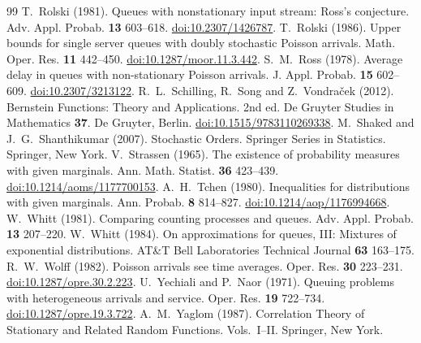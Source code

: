 \documentclass[10pt,a4paper]{amsart}
\numberwithin{equation}{section}
\newcommand{\1}{\mathbf 1}
\begin{document}
\begin{thebibliography}{99}
 T.~Rolski (1981). Queues with nonstationary input stream: Ross's conjecture. Adv. Appl. Probab. \textbf{13} 603--618. \href{https://doi.org/10.2307/1426787}{doi:10.2307/1426787}.
 T.~Rolski (1986). Upper bounds for single server queues with doubly stochastic Poisson arrivals. Math. Oper. Res. \textbf{11} 442--450. \href{https://doi.org/10.1287/moor.11.3.442}{doi:10.1287/moor.11.3.442}.
 S.~M.~Ross (1978). Average delay in queues with non-stationary Poisson arrivals. J. Appl. Probab. \textbf{15} 602--609. \href{https://doi.org/10.2307/3213122}{doi:10.2307/3213122}.
 R.~L.~Schilling, R.~Song and Z.~Vondra\v{c}ek (2012). Bernstein Functions: Theory and Applications. 2nd ed. De Gruyter Studies in Mathematics \textbf{37}. De Gruyter, Berlin. \href{https://doi.org/10.1515/9783110269338}{doi:10.1515/9783110269338}.
 M.~Shaked and J.~G.~Shanthikumar (2007). Stochastic Orders. Springer Series in Statistics. Springer, New York.
 V.~Strassen (1965). The existence of probability measures with given marginals. Ann. Math. Statist. \textbf{36} 423--439. \href{https://doi.org/10.1214/aoms/1177700153}{doi:10.1214/aoms/1177700153}.
 A.~H.~Tchen (1980). Inequalities for distributions with given marginals. Ann. Probab. \textbf{8} 814--827. \href{https://doi.org/10.1214/aop/1176994668}{doi:10.1214/aop/1176994668}.
 W.~Whitt (1981). Comparing counting processes and queues. Adv. Appl. Probab. \textbf{13} 207--220.
 W.~Whitt (1984). On approximations for queues, III: Mixtures of exponential distributions. AT\&T Bell Laboratories Technical Journal \textbf{63} 163--175.
 R.~W.~Wolff (1982). Poisson arrivals see time averages. Oper. Res. \textbf{30} 223--231. \href{https://doi.org/10.1287/opre.30.2.223}{doi:10.1287/opre.30.2.223}.
 U.~Yechiali and P.~Naor (1971). Queuing problems with heterogeneous arrivals and service. Oper. Res. \textbf{19} 722--734. \href{https://doi.org/10.1287/opre.19.3.722}{doi:10.1287/opre.19.3.722}.
 A.~M.~Yaglom (1987). Correlation Theory of Stationary and Related Random Functions. Vols.~I--II. Springer, New York.
\end{thebibliography}
\end{document}
